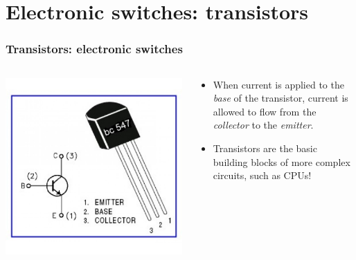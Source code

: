 \documentclass{beamer}
\begin{document}
\section{Electronic switches: transistors}

\begin{frame}
  \frametitle{Transistors: electronic switches}

  \begin{columns}
    \begin{column}{0.5\textwidth}
      \centering
      \includegraphics[width=\textwidth]{res/transistor.jpg}
    \end{column}
    \begin{column}{0.5\textwidth}
      \begin{itemize}
        \item
          When current is applied to the \emph{base} of the transistor, current
          is allowed to flow from the \emph{collector} to the \emph{emitter}.
        \item
          Transistors are the basic building blocks of more complex circuits,
          such as CPUs!
      \end{itemize}
    \end{column}
  \end{columns}
\end{frame}
\end{document}
